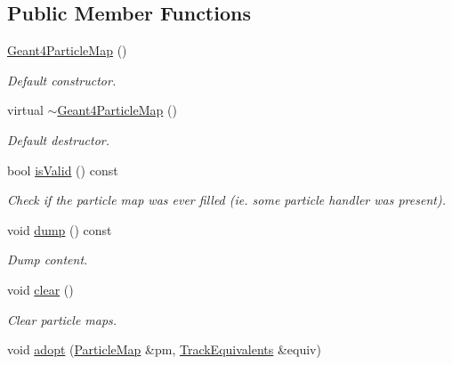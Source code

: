\subsection*{Public Member Functions}
\begin{DoxyCompactItemize}
\item 
\hyperlink{class_d_d4hep_1_1_simulation_1_1_geant4_particle_map_aeada79751afc2787bc020aff0e413504}{Geant4ParticleMap} ()
\begin{DoxyCompactList}\small\item\em Default constructor. \item\end{DoxyCompactList}\item 
virtual \hyperlink{class_d_d4hep_1_1_simulation_1_1_geant4_particle_map_ab81a69115c8908be2ae5a2cee23bd80e}{$\sim$Geant4ParticleMap} ()
\begin{DoxyCompactList}\small\item\em Default destructor. \item\end{DoxyCompactList}\item 
bool \hyperlink{class_d_d4hep_1_1_simulation_1_1_geant4_particle_map_a66ca25cafd6b47eb61632c7bfb9c5a36}{isValid} () const 
\begin{DoxyCompactList}\small\item\em Check if the particle map was ever filled (ie. some particle handler was present). \item\end{DoxyCompactList}\item 
void \hyperlink{class_d_d4hep_1_1_simulation_1_1_geant4_particle_map_afde244bfd828c1b09e515c76626a925e}{dump} () const 
\begin{DoxyCompactList}\small\item\em Dump content. \item\end{DoxyCompactList}\item 
void \hyperlink{class_d_d4hep_1_1_simulation_1_1_geant4_particle_map_a8a8ea52d779e40d4f41b369a8bc659fe}{clear} ()
\begin{DoxyCompactList}\small\item\em Clear particle maps. \item\end{DoxyCompactList}\item 
void \hyperlink{class_d_d4hep_1_1_simulation_1_1_geant4_particle_map_a272d5c51f1c4d6d7b526288f99611811}{adopt} (\hyperlink{class_d_d4hep_1_1_simulation_1_1_geant4_particle_map_a065c5fb0629285022b9aa2a628bffef3}{ParticleMap} \&pm, \hyperlink{class_d_d4hep_1_1_simulation_1_1_geant4_particle_map_aba09f5fcb2dd5874d129660ad4454a21}{TrackEquivalents} \&equiv)

\end{DoxyCompactItemize}
